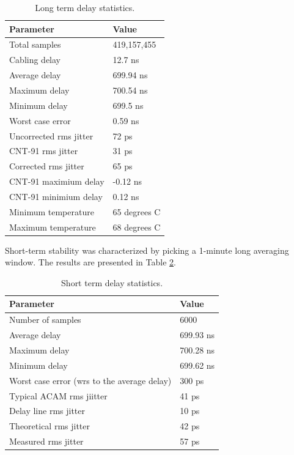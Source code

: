 \documentclass{article}
\begin{document}
\begin{table}[h]
  \centering
\caption{Long term delay statistics.}
\vskip 2mm
\begin{tabular}{ l | l }
\bfseries{Parameter} & \bfseries{Value} \\
\hline
Total samples & 419,157,455\\
Cabling delay & 12.7 ns\\
Average delay & 699.94 ns\\
Maximum delay & 700.54 ns\\
Minimum delay & 699.5 ns\\
Worst case error & 0.59 ns\\
Uncorrected rms jitter & 72 ps\\
CNT-91 rms jitter & 31 ps\\
Corrected rms jitter & 65 ps\\
CNT-91 maximium delay & -0.12 ns\\
CNT-91 minimium delay & 0.12 ns\\
Minimum temperature & 65 degrees C\\
Maximum temperature & 68 degrees C \\
\end{tabular}

\label{tbl:summary}
\end{table}

Short-term stability was characterized by picking a 1-minute long averaging window. The results are presented in Table \ref{tbl:summary_notemp}.

\begin{table}[h]
  \centering
\caption{Short term delay statistics.}
\vskip 2mm
\begin{tabular}{ l | l }
\bfseries{Parameter} & \bfseries{Value} \\
\hline
Number of samples & 6000\\
Average delay & 699.93 ns\\
Maximum delay & 700.28 ns\\
Minimum delay & 699.62 ns\\
Worst case error (wrs to the average delay) & 300 ps\\
Typical ACAM rms jiitter & 41 ps\\
Delay line rms jitter & 10 ps\\
Theoretical rms jitter & 42 ps\\
Measured rms jitter & 57 ps\\
\end{tabular}

\label{tbl:summary_notemp}
\end{table}
\end{document}
